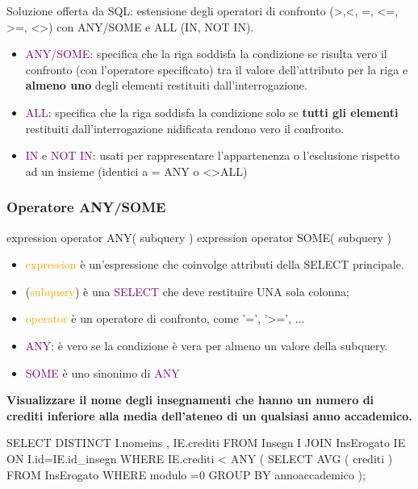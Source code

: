 Soluzione offerta da SQL: estensione degli operatori di confronto (>,<, =, <=, 
>=, <>) con ANY/SOME e ALL (IN, NOT IN). 
\begin{itemize}
  \item \textcolor{purple}{ANY/SOME}: specifica che la riga soddisfa la condizione se risulta vero il 
confronto (con l'operatore specificato) tra il valore dell'attributo per la riga e 
\textbf{almeno uno} degli elementi restituiti dall'interrogazione. 
  \item \textcolor{purple}{ALL}: specifica che la riga soddisfa la condizione solo se \textbf{tutti gli elementi} 
restituiti dall'interrogazione nidificata rendono vero il confronto. 
\item \textcolor{purple}{IN} e \textcolor{purple}{NOT IN}: usati per rappresentare l'appartenenza o l'esclusione rispetto ad 
un insieme (identici a = ANY o <>ALL)
\end{itemize}


\subsubsection{Operatore ANY/SOME}
\begin{codiceSQL}
  expression operator ANY( subquery )
expression operator SOME( subquery )
\end{codiceSQL}

\begin{itemize}
  \item \textcolor{orange}{expression} è un’espressione che coinvolge attributi della SELECT principale.
  \item (\textcolor{orange}{subquery}) è una \textcolor{purple}{SELECT} che deve restituire UNA sola colonna;
  \item \textcolor{orange}{operator} è un operatore di confronto, come ’=’, ’>=’, ...
  \item \textcolor{purple}{ANY}: è vero se la condizione è vera per almeno un valore della subquery.
  \item \textcolor{purple}{SOME} è uno sinonimo di \textcolor{purple}{ANY}
\end{itemize}


\textbf{\large Visualizzare il nome degli insegnamenti che hanno un numero di crediti 
inferiore alla media dell’ateneo di un qualsiasi anno accademico.}

\begin{codiceSQL}
  SELECT DISTINCT I.nomeins , IE.crediti
FROM Insegn I 
  JOIN InsErogato IE ON I.id=IE.id_insegn
WHERE IE.crediti < ANY (
  SELECT AVG ( crediti ) 
  FROM InsErogato
  WHERE modulo =0
  GROUP BY annoaccademico
  );
\end{codiceSQL}


